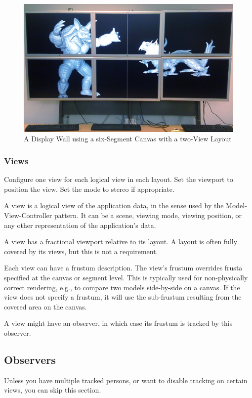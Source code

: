\documentclass[10pt,a4]{scrartcl}
\begin{document}
\begin{figure}[ht!]\center
  \includegraphics[width=.9\textwidth]{images/wallLayout.jpg}
  {\caption{A Display Wall using a six-Segment Canvas with a two-View Layout}}
\end{figure}

\subsubsection{Views}

Configure one \textsf{view} for each logical view in each layout. Set the
\textsf{viewport} to position the view. Set the mode to stereo if appropriate.

A view is a logical view of the application data, in the sense used by
the Model-View-Controller pattern. It can be a scene, viewing mode,
viewing position, or any other representation of the application's data.

A view has a fractional viewport relative to its layout.  A layout
is often fully covered by its views, but this is not a requirement.

Each view can have a frustum description. The view's frustum overrides
frusta specified at the canvas or segment level. This is typically used
for non-physically correct rendering, e.g., to compare two models
side-by-side on a canvas. If the view does not specify a frustum, it
will use the sub-frustum resulting from the covered area on the canvas.

A view might have an observer, in which case its frustum is tracked by
this observer. 

\subsection{Observers}

Unless you have multiple tracked persons, or want to disable tracking on
certain views, you can skip this section.
\end{document}
